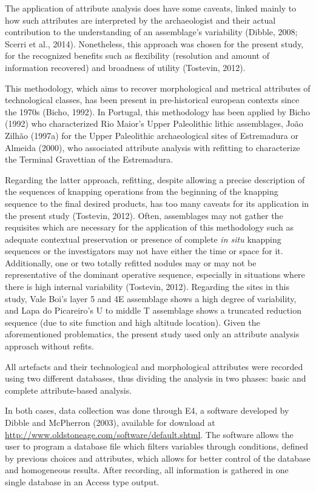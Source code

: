 \documentclass[12pt,twoside]{reedthesis}
\begin{document}
The application of attribute analysis does have some caveats, linked mainly to how such attributes are interpreted by the archaeologist and their actual contribution to the understanding of an assemblage's variability (Dibble, 2008; Scerri et al., 2014). Nonetheless, this approach was chosen for the present study, for the recognized benefits such as flexibility (resolution and amount of information recovered) and broadness of utility (Tostevin, 2012).

This methodology, which aims to recover morphological and metrical attributes of technological classes, has been present in pre-historical european contexts since the 1970s (Bicho, 1992). In Portugal, this methodology has been applied by Bicho (1992) who characterized Rio Maior's Upper Paleolithic lithic assemblages, João Zilhão (1997a) for the Upper Paleolithic archaeological sites of Estremadura or Almeida (2000), who associated attribute analysis with refitting to characterize the Terminal Gravettian of the Estremadura.

Regarding the latter approach, refitting, despite allowing a precise description of the sequences of knapping operations from the beginning of the knapping sequence to the final desired products, has too many caveats for its application in the present study (Tostevin, 2012). Often, assemblages may not gather the requisites which are necessary for the application of this methodology such as adequate contextual preservation or presence of complete \emph{in situ} knapping sequences or the investigators may not have either the time or space for it. Additionally, one or two totally refitted nodules may or may not be representative of the dominant operative sequence, especially in situations where there is high internal variability (Tostevin, 2012). Regarding the sites in this study, Vale Boi's layer 5 and 4E assemblage shows a high degree of variability, and Lapa do Picareiro's U to middle T assemblage shows a truncated reduction sequence (due to site function and high altitude location). Given the aforementioned problematics, the present study used only an attribute analysis approach without refits.

All artefacts and their technological and morphological attributes were recorded using two different databases, thus dividing the analysis in two phases: basic and complete attribute-based analysis.

In both cases, data collection was done through E4, a software developed by Dibble and McPherron (2003), available for download at \url{http://www.oldstoneage.com/software/default.shtml}. The software allows the user to program a database file which filters variables through conditions, defined by previous choices and attributes, which allows for better control of the database and homogeneous results. After recording, all information is gathered in one single database in an Access type output.
\end{document}
